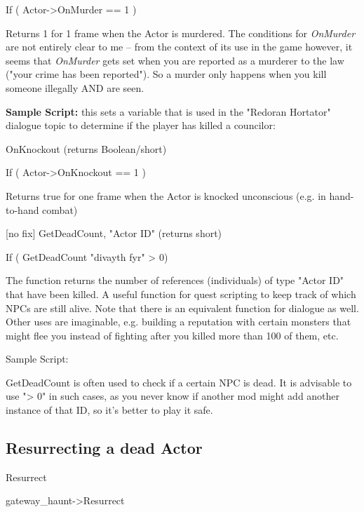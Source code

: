 If ( Actor-\textgreater OnMurder == 1 )

Returns 1 for 1 frame when the Actor is murdered. The conditions for
\emph{OnMurder} are not entirely clear to me -- from the context of its
use in the game however, it seems that \emph{OnMurder} gets set when you
are reported as a murderer to the law ("your crime has been reported").
So a murder only happens when you kill someone illegally AND are seen.

\textbf{Sample Script:} this sets a variable that is used in the
"Redoran Hortator" dialogue topic to determine if the player has killed
a councilor:



OnKnockout (returns Boolean/short)

If ( Actor-\textgreater OnKnockout == 1 )

Returns true for one frame when the Actor is knocked unconscious (e.g.
in hand-to-hand combat)

{[}no fix{]} GetDeadCount, "Actor ID" (returns short)

If ( GetDeadCount "divayth fyr" \textgreater{} 0)

The function returns the number of references (individuals) of type
"Actor ID" that have been killed. A useful function for quest scripting
to keep track of which NPCs are still alive. Note that there is an
equivalent function for dialogue as well. Other uses are imaginable,
e.g. building a reputation with certain monsters that might flee you
instead of fighting after you killed more than 100 of them, etc.

Sample Script:

GetDeadCount is often used to check if a certain NPC is dead. It is
advisable to use "\textgreater{} 0" in such cases, as you never know if
another mod might add another instance of that ID, so it's better to
play it safe.



\hypertarget{resurrecting-a-dead-actor}{%
\subsection{\texorpdfstring{\hfill\break
Resurrecting a dead
Actor}{ Resurrecting a dead Actor}}\label{resurrecting-a-dead-actor}}

Resurrect

gateway\_haunt-\textgreater Resurrect

